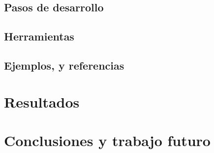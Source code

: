 \documentclass[xcolor=table,serif]{beamer}
\begin{document}
	\subsection{Pasos de desarrollo}
	\subsection{Herramientas}
	\subsection{Ejemplos, y referencias}
\section{Resultados}

\section{Conclusiones y trabajo futuro}	
\end{document}
